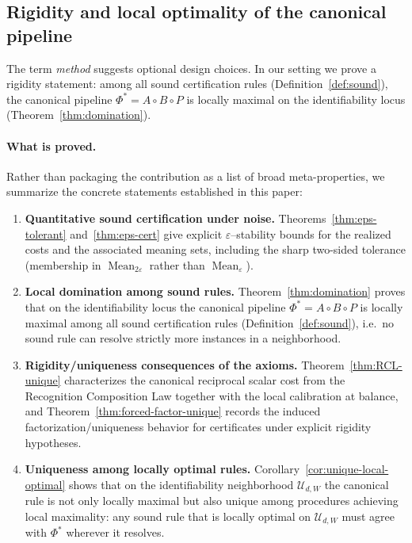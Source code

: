 \documentclass[11pt,reqno]{amsart}
\theoremstyle{definition}
\theoremstyle{remark}
\newcommand{\1}{\mathbf{1}}
\newcommand{\Mean}{\operatorname{Mean}}
\begin{document}
\subsection{Rigidity and local optimality of the canonical pipeline}
The term \emph{method} suggests optional design choices. In our setting we prove a rigidity statement: among all sound certification rules (Definition~\ref{def:sound}), the canonical pipeline $\Phi^\ast=A\circ B\circ P$ is locally maximal on the identifiability locus (Theorem~\ref{thm:domination}).

\paragraph{What is proved.}
Rather than packaging the contribution as a list of broad meta-properties, we summarize the concrete statements established in this paper:
\begin{enumerate}[label=\textup{(\roman*)},leftmargin=2.2em]
\item \textbf{Quantitative sound certification under noise.} Theorems~\ref{thm:eps-tolerant} and~\ref{thm:eps-cert} give explicit $\varepsilon$--stability bounds for the realized costs and the associated meaning sets, including the sharp two-sided tolerance (membership in $\Mean_{2\varepsilon}$ rather than $\Mean_{\varepsilon}$).
\item \textbf{Local domination among sound rules.} Theorem~\ref{thm:domination} proves that on the identifiability locus the canonical pipeline $\Phi^\ast=A\circ B\circ P$ is locally maximal among all sound certification rules (Definition~\ref{def:sound}), i.e.\ no sound rule can resolve strictly more instances in a neighborhood.
\item \textbf{Rigidity/uniqueness consequences of the axioms.} Theorem~\ref{thm:RCL-unique} characterizes the canonical reciprocal scalar cost from the Recognition Composition Law together with the local calibration at balance, and Theorem~\ref{thm:forced-factor-unique} records the induced factorization/uniqueness behavior for certificates under explicit rigidity hypotheses.
\item \textbf{Uniqueness among locally optimal rules.} Corollary~\ref{cor:unique-local-optimal} shows that on the identifiability neighborhood $\mathcal{U}_{d,W}$ the canonical rule is not only locally maximal but also unique among procedures achieving local maximality: any sound rule that is locally optimal on $\mathcal{U}_{d,W}$ must agree with $\Phi^\ast$ wherever it resolves.
\end{enumerate}
\end{document}

